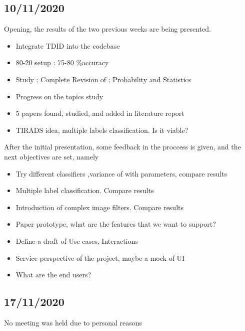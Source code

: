 \documentclass[openany]{article}
\begin{document}
		\subsection{10/11/2020}
			Opening, the results of the two previous weeks are being presented.
			\begin{itemize}
				\item Integrate TDID into the codebase
				\item 80-20 setup : 75-80 \%accuracy
				\item Study : Complete Revision of : Probability and Statistics
				\item Progress on the topics study
				\item 5 papers found, studied, and added in literature report
				\item TIRADS idea, multiple labels classification. Is it viable?
			\end{itemize}	
			After the initial presentation, some feedback in the proccess is given, and the next objectives are set, namely
			\begin{itemize}
				\item Try different classifiers ,variance of with parameters, compare results
				\item Multiple label classification. Compare results
				\item Introduction of complex image filters. Compare results
				\item Paper prototype, what are the features that we want to support?
				\item Define a draft of Use cases, Interactions
				\item Service perspective of the project, maybe a mock of UI
				\item What are the end users?
			\end{itemize}
		\subsection{17/11/2020}
			No meeting was held due to personal reasons
\end{document}
